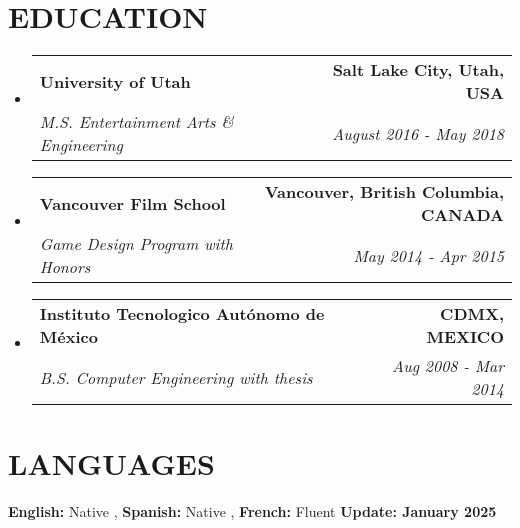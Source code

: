 \documentclass[letterpaper,11pt]{article}
\makeatletter
\newcommand{\resumeSubheading}[4]{
  \vspace{-2pt}\item
    \begin{tabular*}{1.0\textwidth}[t]{l@{\extracolsep{\fill}}r}
      \textbf{\large#1} & \textbf{\small #2} \\
      \textit{\large#3} & \textit{\small #4} \\
      
    \end{tabular*}\vspace{-7pt}
}
\newcommand{\resumeSubHeadingListStart}{\begin{itemize}[leftmargin=0.0in, label={}]}
\newcommand{\resumeSubHeadingListEnd}{\end{itemize}}
\makeatother
\begin{document}
\section{\color{airforceblue}EDUCATION}
\begin{adjustwidth}{.25in}{0in} %
\resumeSubHeadingListStart
  \resumeSubheading
    {University of Utah}{
      \hfill \small{Salt Lake City, Utah, USA} \hspace{14pt} %
    }
    {M.S. Entertainment Arts \& Engineering}{
      \hfill \small{August 2016 - May 2018} \hspace{14pt} %
    }
  \vspace{-4pt}
   \resumeSubheading
    {Vancouver Film School}{
      \hfill \small{Vancouver, British Columbia, CANADA} \hspace{14pt} %
    }
    {Game Design Program with Honors}{
      \hfill \small{May 2014 - Apr 2015} \hspace{14pt} %
    }
  \vspace{-4pt}
   \resumeSubheading
    {Instituto Tecnologico Autónomo de México}{
      \hfill \small{CDMX, MEXICO} \hspace{14pt} %
    }
    {B.S. Computer Engineering with thesis}{
      \hfill \small{Aug 2008 - Mar 2014} \hspace{14pt} %
    }
\resumeSubHeadingListEnd
\end{adjustwidth}
\vspace{-4pt}

\section{\color{airforceblue}LANGUAGES}
\begin{itemize}[leftmargin=0.25in, label={}]
  \small{\item{
   \textbf{\normalsize{English:}}{ \normalsize{Native}} ,
   \textbf{\normalsize{Spanish:}}{ \normalsize{Native}} ,
    \textbf{\normalsize{French:}}{ \normalsize{Fluent}}
    \hfill \small{\textbf{Update: January 2025}} %
   }}
\end{itemize}
\end{document}
